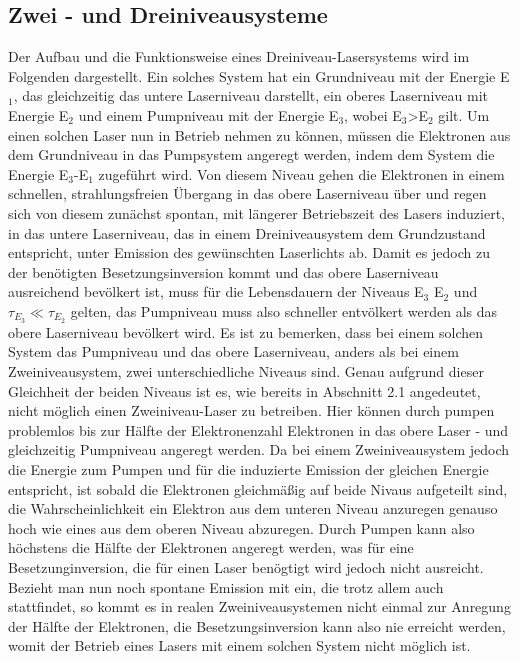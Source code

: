 \subsection{Zwei - und Dreiniveausysteme}
Der Aufbau und die Funktionsweise eines Dreiniveau-Lasersystems wird im Folgenden dargestellt. \newline
Ein solches System hat ein Grundniveau mit der Energie E$_1$, das gleichzeitig das untere Laserniveau darstellt, ein oberes Laserniveau mit Energie E$_2$ und einem Pumpniveau mit der Energie E$_3$, wobei E$_3$>E$_2$ gilt. \newline
Um einen solchen Laser nun in Betrieb nehmen zu können, müssen die Elektronen aus dem Grundniveau in das Pumpsystem angeregt werden, indem dem System die Energie E$_3$-E$_1$ zugeführt wird. Von diesem Niveau gehen die Elektronen in einem schnellen, strahlungsfreien Übergang in das obere Laserniveau über und regen sich von diesem zunächst spontan, mit längerer Betriebszeit des Lasers induziert, in das untere Laserniveau, das in einem Dreiniveausystem dem Grundzustand entspricht, unter Emission des gewünschten Laserlichts ab. Damit es jedoch zu der benötigten Besetzungsinversion kommt und das obere Laserniveau ausreichend bevölkert ist, muss für die Lebensdauern der Niveaus E$_3$ E$_2$ und $\tau_{E_3} \ll\tau_{E_2}$ gelten, das Pumpniveau muss also schneller entvölkert werden als das obere Laserniveau bevölkert wird. \newline
Es ist zu bemerken, dass bei einem solchen System das Pumpniveau und das obere Laserniveau, anders als bei einem Zweiniveausystem, zwei unterschiedliche Niveaus sind. Genau aufgrund dieser Gleichheit der beiden Niveaus ist es, wie bereits in Abschnitt 2.1 angedeutet, nicht möglich einen Zweiniveau-Laser zu betreiben. Hier können durch pumpen problemlos bis zur Hälfte der Elektronenzahl Elektronen in das obere Laser - und gleichzeitig Pumpniveau angeregt werden. Da bei einem Zweiniveausystem jedoch die Energie zum Pumpen und für die induzierte Emission der gleichen Energie entspricht, ist sobald die Elektronen gleichmäßig auf beide Nivaus aufgeteilt sind, die Wahrscheinlichkeit ein Elektron aus dem unteren Niveau anzuregen genauso hoch wie eines aus dem oberen Niveau abzuregen. Durch Pumpen kann also höchstens die Hälfte der Elektronen angeregt werden, was für eine Besetzunginversion, die für einen Laser benögtigt wird jedoch nicht ausreicht. Bezieht man nun noch spontane Emission mit ein, die trotz allem auch stattfindet, so kommt es in realen Zweiniveausystemen nicht einmal zur Anregung der Hälfte der Elektronen, die Besetzungsinversion kann also nie erreicht werden, womit der Betrieb eines Lasers mit einem solchen System nicht möglich ist.
